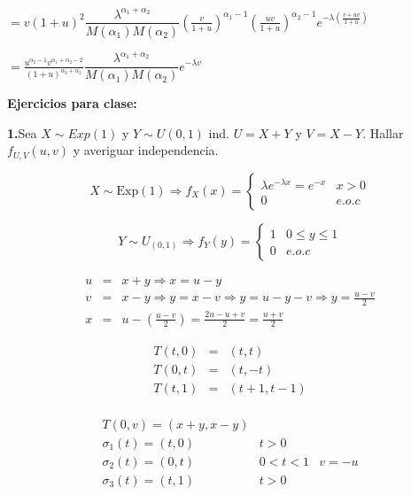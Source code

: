 \smallskip

$ = v \left(1+u \right)^{2} \dfrac{\lambda^{\alpha_{1}+\alpha_{2} } }{M \left(\alpha_{1}\right)M \left(\alpha_{2}\right)} \left( \frac{v}{1+u}\right)^{ \alpha_{1}-1} \left( \frac{uv}{1+u} \right)^{\alpha_{2}-1}e^{-\lambda \left(\frac{v+uv}{1+u} \right)}$

\smallskip

$= \frac{u^{\alpha_{2}-1}v^{\alpha_{1}+\alpha_{2}-2}}{\left(1+u \right)^{ \alpha_{2}+ \alpha_{2}}} \dfrac{\lambda^{\alpha_{1}+\alpha_{2} } }{M \left(\alpha_{1}\right)M \left(\alpha_{2}\right)} e^{-\lambda v } $

\smallskip

\textbf{Ejercicios para clase:}

\smallskip

\noindent \textbf{1.}Sea $X \sim Exp \left( 1 \right)$ y $Y \sim U \left( 0,1 \right)$ ind. $U=X+Y$ y $V=X-Y$. Hallar $f_{U,V} \left( u,v \right)$ y averiguar independencia.

\[
X \sim \text{Exp} \left( 1 \right) \Rightarrow f_{X}\left( x \right)=
\begin{cases}
\lambda e^{-\lambda x }= e^{-x} & x>0 \\ 
0 & e.o.c
\end{cases}
\]

\[
Y \sim U_{ \left( 0,1 \right) } \Rightarrow f_{Y}\left(y \right)=
\begin{cases}
1 & 0 \leq  y \leq 1 \\ 
0 & e.o.c
\end{cases}
\]

\begin{eqnarray*}
u&=& x+y \Rightarrow x=u-y  \\
v&=& x-y \Rightarrow y=x-v \Rightarrow y=u-y-v \Rightarrow y= \frac{u-v}{2}\\
x&=&u-\left(\frac{u-v}{2}\right)=\frac{2u-u+v}{2}=\frac{u+v}{2}
\end{eqnarray*}

\begin{eqnarray*}
T \left(t,0 \right) &=& \left( t,t \right)\\
T \left(0,t \right) &=& \left( t,-t \right)\\
T \left(t,1 \right) &=& \left( t+1,t-1 \right)\\
\end{eqnarray*}

\bigskip

\begin{eqnarray*}
T \left(0,v \right) = \left( x+y,x-y \right)\\
\sigma_{1} \left(t \right) = \left( t,0 \right) & t>0 \\
\sigma_{2} \left(t \right)= \left( 0,t \right) & 0<t<1 & v=-u \\
\sigma_{3} \left(t \right) = \left( t,1 \right) & t>0 
\end{eqnarray*}

